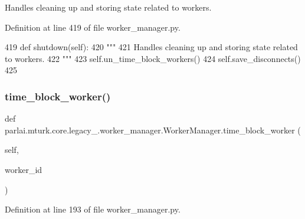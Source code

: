 \begin{DoxyVerb}Handles cleaning up and storing state related to workers.
\end{DoxyVerb}
 

Definition at line 419 of file worker\+\_\+manager.\+py.


\begin{DoxyCode}
419     \textcolor{keyword}{def }shutdown(self):
420         \textcolor{stringliteral}{"""}
421 \textcolor{stringliteral}{        Handles cleaning up and storing state related to workers.}
422 \textcolor{stringliteral}{        """}
423         self.un\_time\_block\_workers()
424         self.save\_disconnects()
425 \end{DoxyCode}
\mbox{\label{classparlai_1_1mturk_1_1core_1_1legacy__2018_1_1worker__manager_1_1WorkerManager_ae4a79610f990f2b850132f503b9e68f9}} 
\subsubsection{\texorpdfstring{time\+\_\+block\+\_\+worker()}{time\_block\_worker()}}
{\footnotesize\ttfamily def parlai.\+mturk.\+core.\+legacy\+\_.\+worker\+\_\+manager.\+Worker\+Manager.\+time\+\_\+block\+\_\+worker (\begin{DoxyParamCaption}\item[{}]{self,  }\item[{}]{worker\+\_\+id }\end{DoxyParamCaption})}



Definition at line 193 of file worker\+\_\+manager.\+py.


